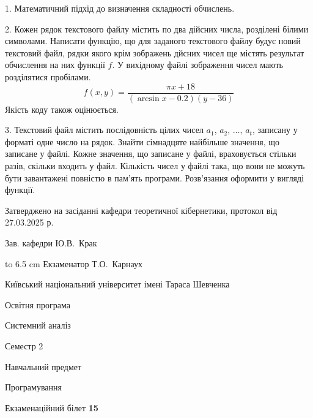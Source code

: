 \documentclass[12pt, ukrainian]{article}
\begin{document}
{%
1. Математичний підхід до визначення складності обчислень.%
\par
\vspace{2mm}

2. Кожен рядок текстового файлу містить по два дійсних числа, розділені білими символами.
Написати функцію, що для заданого текстового файлу будує новий текстовий файл, рядки якого крім зображень дйсних чисел ще містять результат обчислення на них функції $f$. У вихідному файлі зображення чисел мають розділятися пробілами. 
$$f(x, y) =\frac{\pi x + 18}{(\arcsin x - 0.2) (y - 36)}$$ 
Якість коду також оцінюється.

\par
\vspace{2mm}

3. Текстовий файл містить послідовність цілих чисел $a_1$, $a_2$, $\ldots$, $a_t$, записану у форматі одне число на рядок. Знайти сімнадцяте найбільше значення, що записане у файлі. Кожне значення, що записане у файлі, враховується стільки разів, скільки входить у файл. Кількість чисел у файлі така, що вони не можуть бути завантажені повністю в пам'ять програми. Розв'язання оформити у вигляді функції.

}
{\smallskip\smallskip \begin {scriptsize} Затверджено на засіданні кафедри теоретичної кібернетики, протокол   від   27.03.2025 р.\par\smallskip\smallskip\smallskip\smallskip
{\parbox {6.5 cm} {Зав. кафедри \dotfill Ю.В.~Крак}}\hspace {0.7cm} {\hbox to 6.5 cm { Екзаменатор \dotfill Т.О.~Карнаух}} \end{scriptsize}}
\newpage
{{\begin {scriptsize}\par
{ \center  Київський національний університет імені Тараса Шевченка \par}
{\parbox {5 cm}{Освітня програма \hfill}{\parbox {7 cm}{Системний аналіз\hfill}}\parbox {6 cm}{\hfill Семестр 2}}\par
{\parbox {5 cm} {Навчальний предмет \hfill}\parbox {7 cm}{Програмування \hfill}\parbox {6cm}{\hfill}\par}\vspace{-15pt} \end{scriptsize}}{\center Екзаменаційний білет \No \textbf { 15 }\par}}
\end{document}
